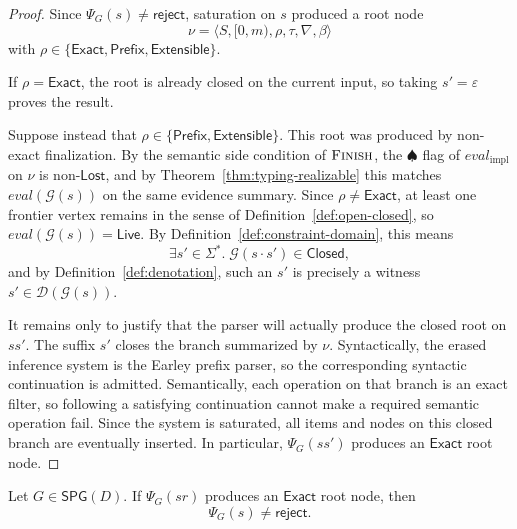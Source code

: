 \begin{proof}
Since $\Psi_G(s) \neq \mathsf{reject}$, saturation on $s$ produced a root node
\[
  \nu = \langle S,[0,m),\rho,\tau,\nabla,\beta\rangle
\]
with $\rho \in \{\mathsf{Exact},\mathsf{Prefix},\mathsf{Extensible}\}$.

If $\rho = \mathsf{Exact}$, the root is already closed on the current input, so taking $s'=\varepsilon$ proves the result.

Suppose instead that $\rho \in \{\mathsf{Prefix},\mathsf{Extensible}\}$. This root was produced by non-exact finalization. By the semantic side condition of $\textsc{Finish}$, the $\spadesuit$ flag of $\mathit{eval}_{\mathrm{impl}}$ on $\nu$ is non-$\mathsf{Lost}$, and by Theorem~\ref{thm:typing-realizable} this matches $\mathit{eval}(\mathcal G(s))$ on the same evidence summary. Since $\rho \neq \mathsf{Exact}$, at least one frontier vertex remains in the sense of Definition~\ref{def:open-closed}, so $\mathit{eval}(\mathcal G(s)) = \mathsf{Live}$. By Definition~\ref{def:constraint-domain}, this means
\[
\exists s'\in\Sigma^\ast.\;\mathcal G(s\cdot s') \in \mathsf{Closed},
\]
and by Definition~\ref{def:denotation}, such an $s'$ is precisely a witness $s' \in \mathcal D(\mathcal G(s))$.

It remains only to justify that the parser will actually produce the closed root on $ss'$. The suffix $s'$ closes the branch summarized by $\nu$. Syntactically, the erased inference system is the Earley prefix parser, so the corresponding syntactic continuation is admitted. Semantically, each operation on that branch is an exact filter, so following a satisfying continuation cannot make a required semantic operation fail. Since the system is saturated, all items and nodes on this closed branch are eventually inserted. In particular, $\Psi_G(ss')$ produces an $\mathsf{Exact}$ root node.
\end{proof}

\begin{lemma}
\label{lem:prefix-completeness}
Let $G \in \mathsf{SPG}(D)$. If $\Psi_G(sr)$ produces an $\mathsf{Exact}$ root node, then
\[
  \Psi_G(s) \neq \mathsf{reject}.
\]
\end{lemma}

